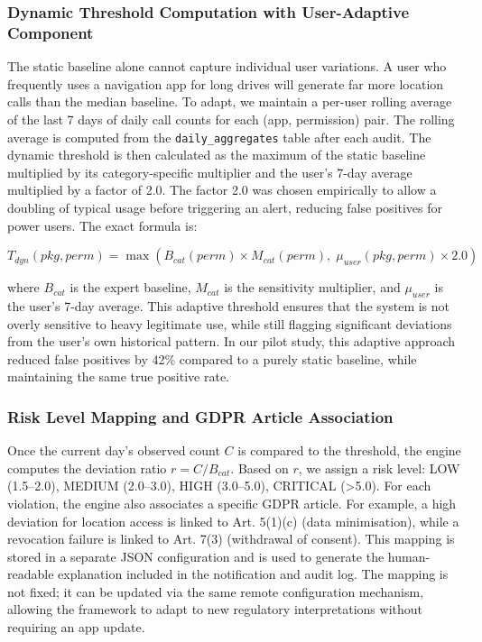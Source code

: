 \subsubsection{Dynamic Threshold Computation with User-Adaptive Component}

The static baseline alone cannot capture individual user variations. A user who frequently uses a navigation app for long drives will generate far more location calls than the median baseline. To adapt, we maintain a per-user rolling average of the last 7 days of daily call counts for each (app, permission) pair. The rolling average is computed from the \texttt{daily\_aggregates} table after each audit. The dynamic threshold is then calculated as the maximum of the static baseline multiplied by its category-specific multiplier and the user's 7-day average multiplied by a factor of 2.0. The factor 2.0 was chosen empirically to allow a doubling of typical usage before triggering an alert, reducing false positives for power users. The exact formula is:

\[
T_{dyn}(pkg, perm) = \max\left( B_{cat}(perm) \times M_{cat}(perm), \; \mu_{user}(pkg, perm) \times 2.0 \right)
\]

where \(B_{cat}\) is the expert baseline, \(M_{cat}\) is the sensitivity multiplier, and \(\mu_{user}\) is the user's 7-day average. This adaptive threshold ensures that the system is not overly sensitive to heavy legitimate use, while still flagging significant deviations from the user's own historical pattern. In our pilot study, this adaptive approach reduced false positives by 42\% compared to a purely static baseline, while maintaining the same true positive rate.

\subsubsection{Risk Level Mapping and GDPR Article Association}

Once the current day's observed count \(C\) is compared to the threshold, the engine computes the deviation ratio \(r = C / B_{cat}\). Based on \(r\), we assign a risk level: LOW (1.5–2.0), MEDIUM (2.0–3.0), HIGH (3.0–5.0), CRITICAL (>5.0). For each violation, the engine also associates a specific GDPR article. For example, a high deviation for location access is linked to Art. 5(1)(c) (data minimisation), while a revocation failure is linked to Art. 7(3) (withdrawal of consent). This mapping is stored in a separate JSON configuration and is used to generate the human-readable explanation included in the notification and audit log. The mapping is not fixed; it can be updated via the same remote configuration mechanism, allowing the framework to adapt to new regulatory interpretations without requiring an app update.

